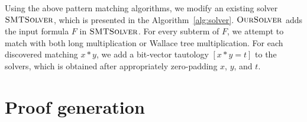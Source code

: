 Using the above pattern matching algorithms, we modify an existing
solver $\textsc{SMTSolver}$, which
is presented in the Algorithm~\ref{alg:solver}.
%
$\textsc{OurSolver}$ adds the input formula $F$ in $\textsc{SMTSolver}$.
%
For every subterm of $F$, we attempt to match with both long multiplication
or Wallace tree multiplication.
%
For each discovered matching $x*y$, we add a bit-vector tautology $[x*y = t]$ 
to the solvers, which is obtained after
appropriately zero-padding $x$, $y$, and $t$.
 


\section{Proof generation}


